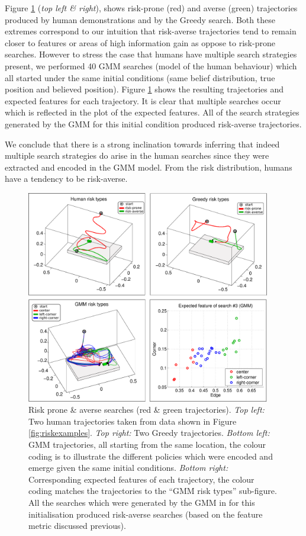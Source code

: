 Figure \ref{fig:risk_examples} (\textit{top left \& right}), shows risk-prone (red) and 
averse (green) trajectories produced by human demonstrations and by the Greedy search. Both these extremes
correspond to our intuition that risk-averse trajectories tend to remain closer to features or areas of high information gain
as oppose to risk-prone searches. However to stress the case that humans have multiple search strategies 
present, we performed 40 GMM searches (model of the human behaviour) which all started under the same initial conditions
(same belief distribution, true position and believed position). Figure \ref{fig:risk_examples}
shows the resulting trajectories and expected features for each trajectory. 
It is clear that multiple searches occur which is reflected in the plot of the expected features. All of the 
search strategies generated by the GMM for this initial condition produced risk-averse trajectories.


We conclude that there is a strong inclination towards inferring that indeed multiple search strategies do 
arise in the human searches since they were extracted and encoded in the GMM model. From the risk distribution, humans have a 
tendency to be risk-averse.

\begin{figure}
 \centering
  \includegraphics[width=0.95\textwidth]{./ch3-Search/Figures/Figure8}
  \caption{Risk prone \& averse searches (red \& green trajectories). \textit{Top left:}
  Two human trajectories taken from data shown in Figure \ref{fig:riskexamples}. 
  \textit{Top right:} Two Greedy trajectories. \textit{Bottom left:} GMM trajectories, all starting from the same location, the
  colour coding is to illustrate the different policies which were encoded and emerge given the same initial conditions. 
  \textit{Bottom right:} Corresponding expected features of each trajectory, the colour coding matches the trajectories 
  to the ``GMM risk types'' sub-figure. All the searches which were generated by the GMM in for this initialisation produced
  risk-averse searches (based on the feature metric discussed previous).}
  \label{fig:risk_examples}
\end{figure}

